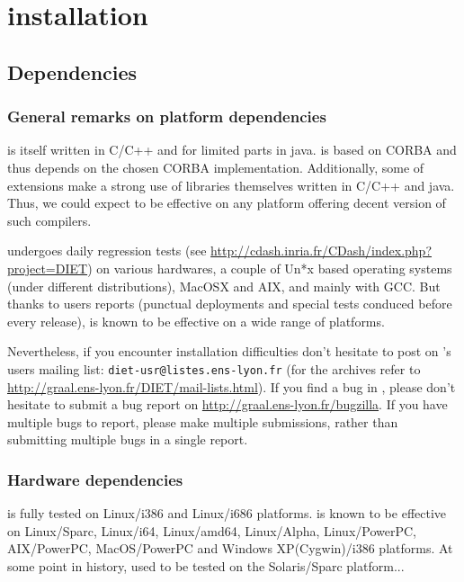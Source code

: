 

\chapter{\diet installation}
\label{ch:installing}

\section{Dependencies}
\label{sec:dependencies}

\subsection{General remarks on \diet platform dependencies}

\diet is itself written in C/C++ and for limited parts in java. \diet is based
on CORBA and thus depends on the chosen CORBA implementation.  Additionally,
some of \diet extensions make a strong use of libraries themselves written in
C/C++ and java. Thus, we could expect \diet to be effective on any platform
offering decent version of such compilers.

\diet undergoes daily regression tests (see
\url{http://cdash.inria.fr/CDash/index.php?project=DIET}) on various hardwares,
a couple of Un*x based operating systems (under different distributions), MacOSX and AIX,
and mainly with GCC. But thanks to users reports (punctual deployments and
special tests conduced before every release), \diet is known to be effective on
a wide range of platforms.

Nevertheless, if you encounter installation difficulties don't hesitate to post
on \diet's users mailing list: \verb+diet-usr@listes.ens-lyon.fr+ (for the
archives refer to \url{http://graal.ens-lyon.fr/DIET/mail-lists.html}).  If you
find a bug in \diet, please don't hesitate to submit a bug report on
\url{http://graal.ens-lyon.fr/bugzilla}. If you have multiple bugs to report,
please make multiple submissions, rather than submitting multiple bugs in a
single report.

\subsection{Hardware dependencies}
\diet is fully tested on Linux/i386 and Linux/i686 platforms. \diet is known to
be effective on Linux/Sparc, Linux/i64, Linux/amd64, Linux/Alpha,
Linux/PowerPC, AIX/PowerPC, MacOS/PowerPC and Windows XP(Cygwin)/i386 platforms. 
At some point in \diet history, \diet used to be tested on the Solaris/Sparc platform...

